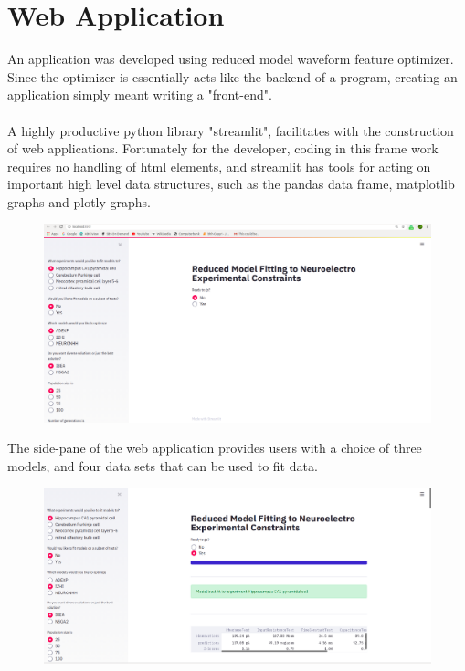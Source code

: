 \section{Web Application}
An application was developed using reduced model waveform feature optimizer. Since the optimizer is essentially acts like the backend of a program, creating an application simply meant writing a "front-end".\\
\\
A highly productive python library "streamlit", facilitates with the construction of web applications. Fortunately for the developer, coding in this frame work requires no handling of html elements, and streamlit has tools for acting on important high level data structures, such as the pandas data frame, matplotlib graphs and plotly graphs.\\
\begin{figure}
\includegraphics[]{chapters/app_tex/web_app_thesis}
\end{figure}
The side-pane of the web application provides users with a choice of three models, and four data sets that can be used to fit data.
\begin{figure}
\includegraphics[]{chapters/app_tex/app_results}
\end{figure}

